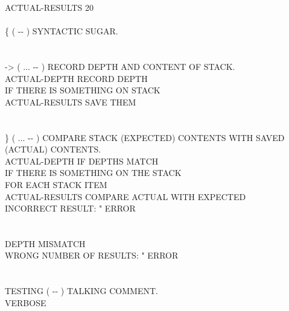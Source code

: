 \begin{tt}
\tab[.7]  ACTUAL-RESULTS 20   \\
\\
\word{:} \{ \tab[2.8]  ( -{}- ) SYNTACTIC SUGAR.\\
\tab \word{;} \\
\\
\word{:} -> \tab[2.2]  ( ... -{}- ) RECORD DEPTH AND CONTENT OF STACK.\\
\tab {}  ACTUAL-DEPTH \word{!}				\tab[5.9]   RECORD DEPTH\\
\tab {} 										\tab[16.1]  IF THERE IS SOMETHING ON STACK\\
  ACTUAL-RESULTS   \word{+} \word{!}  \tab[.6]  SAVE THEM\\
\tab {} \word{;} \\
\\
\word{:} \} \tab[2.8]  ( ... -{}- ) COMPARE STACK (EXPECTED) CONTENTS WITH SAVED\\
\tab[5.2]  (ACTUAL) CONTENTS.\\
\tab {} ACTUAL-DEPTH  \word{=} 		\tab[4.85]   IF DEPTHS MATCH\\
\tab[2]   						\tab[9.05]  IF THERE IS SOMETHING ON THE STACK\\
 											\tab[14.8]  FOR EACH STACK ITEM\\
\tab[4]			 ACTUAL-RESULTS   \word{+} 	\tab[.6]  COMPARE ACTUAL WITH EXPECTED\\
\tab[4]			   INCORRECT RESULT: " ERROR  \\
\tab[3]		\\
\tab[2] \\
\tab {}												\tab[17.4]  DEPTH MISMATCH\\
\tab[2]  WRONG NUMBER OF RESULTS: " ERROR\\
\tab {} \word{;} \\
\\
\word{:} TESTING \tab[.65]  ( -{}- ) TALKING COMMENT.\\
\tab {} VERBOSE  \\
\tab {}       \word{!}\\
\tab {}  \word{!} \\
\tab {} \word{;}
\end{tt}

